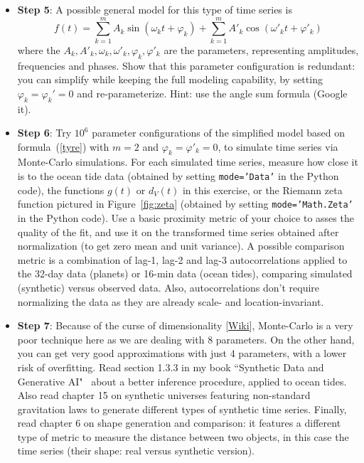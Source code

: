 \documentclass[oneside,10pt]{book}
\begin{document}
\begin{itemize}
\item[] {\bf Step 5}: A possible general model for this type of time series is
\begin{equation}
f(t) = \sum_{k=1}^m A_k \sin(\omega_kt + \varphi_k) + \sum_{k=1}^m A'_k \cos(\omega'_kt + \varphi'_k) \label{tyre}
\end{equation}
where the $A_k, A'_k, \omega_k,\omega'_k,\varphi_k,\varphi'_k$ are the parameters, representing amplitudes, frequencies and phases. Show that this parameter configuration is redundant:  you can simplify while keeping the full modeling capability, by setting
$\varphi_k = \varphi_k'=0$ and re-parameterize. Hint: use the angle sum formula (Google it).\vspace{1ex}
\item[] {\bf Step 6}: Try $10^6$ parameter configurations of the simplified model based on formula~(\ref{tyre}) 
with $m=2$ and $\varphi_k=\varphi'_k=0$, to
 simulate time series via \textcolor{index}{Monte-Carlo simulations}. For each simulated time series, measure how close it is to the ocean tide data (obtained by setting \texttt{mode='Data'} in the Python code), the functions $g(t)$ or $d_V(t)$ in this exercise, or the Riemann zeta function pictured in Figure~\ref{fig:zeta} (obtained by setting
\texttt{mode='Math.Zeta'} in the Python code). Use a basic proximity metric of your choice to asses the quality of the fit, and use it 
on the transformed time series obtained after normalization (to get zero mean and unit variance). A possible comparison metric is
a combination of  lag-1, lag-2 and lag-3 \textcolor{index}{autocorrelations} applied to the 32-day data (planets) or 16-min data (ocean tides), comparing simulated (synthetic) versus observed data. Also, autocorrelations don't require normalizing the data as they are already scale- and location-invariant.\vspace{1ex}
\item[] {\bf Step 7}: Because of the \textcolor{index}{curse of dimensionality} [\href{https://en.wikipedia.org/wiki/Curse_of_dimensionality}{Wiki}], Monte-Carlo is a very poor technique here as we are dealing with $8$ parameters. On the other hand, you can get very good approximations with just 4 parameters, with a lower risk of overfitting. Read
section 1.3.3 in my book ``Synthetic Data and Generative AI"~\cite{vgelsevier} about a better inference procedure, applied to ocean tides. 
Also read chapter 15 on synthetic universes featuring non-standard gravitation laws to generate different types of  synthetic time series. Finally, read chapter 6 on shape generation and comparison: it features a different type of metric to measure the distance between two objects, in this case the time series (their shape: real versus synthetic version). 
\end{itemize}
\end{document}
